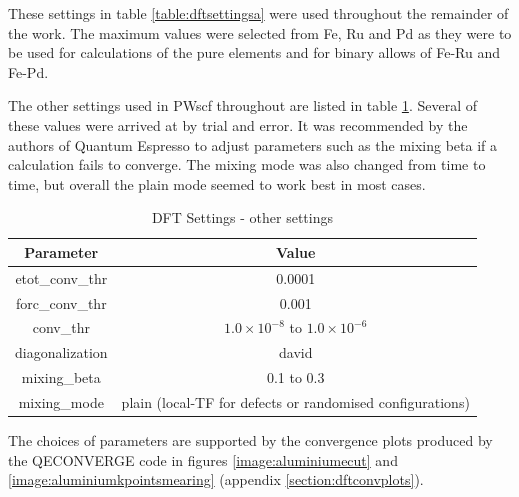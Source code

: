 These settings in table \ref{table:dftsettingsa} were used throughout the remainder of the work.  The maximum values were selected from Fe, Ru and Pd as they were to be used for calculations of the pure elements and for binary allows of Fe-Ru and Fe-Pd.

The other settings used in PWscf throughout are listed in table \ref{table:dftsettingsb}.  Several of these values were arrived at by trial and error.  It was recommended by the authors of Quantum Espresso to adjust parameters such as the mixing beta if a calculation fails to converge.  The mixing mode was also changed from time to time, but overall the plain mode seemed to work best in most cases.

\begin{table}[h]
\begin{center}
\renewcommand{\arraystretch}{1.2}
\begin{tabular}{c c}
\hline\hline
Parameter & Value \\
\hline\hline
etot\_conv\_thr & 0.0001 \\
forc\_conv\_thr & 0.001 \\ 
conv\_thr & $1.0 \times 10^{-8}$ to $1.0 \times 10^{-6}$ \\ 
diagonalization & david \\ 
mixing\_beta & 0.1 to 0.3 \\ 
mixing\_mode & plain (local-TF for defects or randomised configurations) \\ 
\hline\hline
\end{tabular}
\end{center}
\caption{DFT Settings - other settings}
\label{table:dftsettingsb}
\end{table}

\FloatBarrier

The choices of parameters are supported by the convergence plots produced by the QECONVERGE code in figures \ref{image:aluminiumecut} and \ref{image:aluminiumkpointsmearing} (appendix \ref{section:dftconvplots}).














